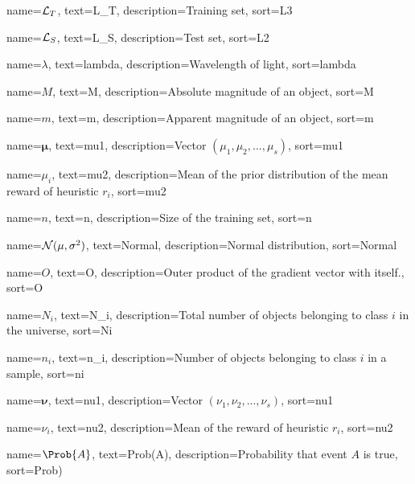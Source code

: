 %
{%
    name={$\mathcal{L}_T$},
    text={L_T},
    description={Training set},
    sort={L3}
}

%
{%
    name={$\mathcal{L}_S$},
    text={L_S},
    description={Test set},
    sort={L2}
}

%
{%
	name={$\lambda$},
	text={lambda},
	description={Wavelength of light},
	sort={lambda}
}

%
{%
	name={$M$},
	text={M},
	description={Absolute magnitude of an object},
	sort={M}
}

%
{%
	name={$m$},
	text={m},
	description={Apparent magnitude of an object},
	sort={m}
}

%
{%
    name={$\bm{\mu}$},
    text={mu1},
    description={Vector $(\mu_1, \mu_2, ..., \mu_s)$},
    sort={mu1}
}

%
{%
    name={$\mu_i$},
    text={mu2},
    description={Mean of the prior distribution of the mean reward of heuristic $r_i$},
    sort={mu2}
}

%
{%
    name={$n$},
    text={n},
    description={Size of the training set},
    sort={n}
}


%
{%
    name={$\mathcal{N}(\mu, \sigma^2)$},
    text={Normal},
    description={Normal distribution},
    sort={Normal}
}


%
{%
    name={$O$},
    text={O},
    description={Outer product of the gradient vector with itself.},
    sort={O}
}



%
{%
	name={$N_i$},
	text={N_i},
	description={Total number of objects belonging to class $i$ in the universe},
	sort={Ni}
}

%
{%
	name={$n_i$},
	text={n_i},
	description={Number of objects belonging to class $i$ in a sample},
	sort={ni}
}

%
{%
    name={$\bm{\nu}$},
    text={nu1},
    description={Vector $(\nu_1, \nu_2, ..., \nu_s)$},
    sort={nu1}
}

%
{%
    name={$\nu_i$},
    text={nu2},
    description={Mean of the reward of heuristic $r_i$},
    sort={nu2}
}

%
{%
    name={$\Prob{A}$},
    text={Prob(A)},
    description={Probability that event $A$ is true},
    sort={Prob)}
}

